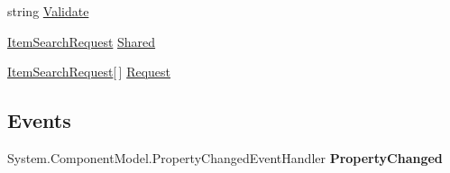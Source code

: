 \begin{DoxyCompactItemize}
\begin{DoxyCompactList}\small\item\em \end{DoxyCompactList}\item 
\hypertarget{class_price___comparison_1_1amazon_1_1ecs_1_1_item_search_a6b706808f465cd86926bdefa849addd3}{string \hyperlink{class_price___comparison_1_1amazon_1_1ecs_1_1_item_search_a6b706808f465cd86926bdefa849addd3}{Validate}}\label{class_price___comparison_1_1amazon_1_1ecs_1_1_item_search_a6b706808f465cd86926bdefa849addd3}

\begin{DoxyCompactList}\small\item\em \end{DoxyCompactList}\item 
\hypertarget{class_price___comparison_1_1amazon_1_1ecs_1_1_item_search_ae2ab6bfc1fa08ef864818393619d9b61}{\hyperlink{class_price___comparison_1_1amazon_1_1ecs_1_1_item_search_request}{Item\-Search\-Request} \hyperlink{class_price___comparison_1_1amazon_1_1ecs_1_1_item_search_ae2ab6bfc1fa08ef864818393619d9b61}{Shared}}\label{class_price___comparison_1_1amazon_1_1ecs_1_1_item_search_ae2ab6bfc1fa08ef864818393619d9b61}

\begin{DoxyCompactList}\small\item\em \end{DoxyCompactList}\item 
\hypertarget{class_price___comparison_1_1amazon_1_1ecs_1_1_item_search_ad514fed6feadca25d752e674b1ff383e}{\hyperlink{class_price___comparison_1_1amazon_1_1ecs_1_1_item_search_request}{Item\-Search\-Request}\mbox{[}$\,$\mbox{]} \hyperlink{class_price___comparison_1_1amazon_1_1ecs_1_1_item_search_ad514fed6feadca25d752e674b1ff383e}{Request}}\label{class_price___comparison_1_1amazon_1_1ecs_1_1_item_search_ad514fed6feadca25d752e674b1ff383e}

\begin{DoxyCompactList}\small\item\em \end{DoxyCompactList}\end{DoxyCompactItemize}
\subsection*{Events}
\begin{DoxyCompactItemize}
\item 
\hypertarget{class_price___comparison_1_1amazon_1_1ecs_1_1_item_search_a957f5a27d3acd7ca75d594a965418df4}{System.\-Component\-Model.\-Property\-Changed\-Event\-Handler {\bfseries Property\-Changed}}\label{class_price___comparison_1_1amazon_1_1ecs_1_1_item_search_a957f5a27d3acd7ca75d594a965418df4}

\end{DoxyCompactItemize}
